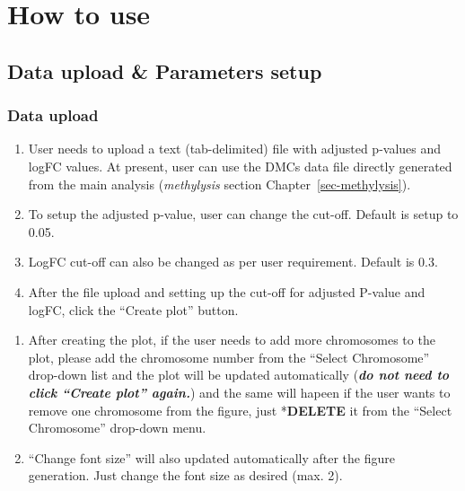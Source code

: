 \documentclass[
  a4paper,
  oneside,
  open=any]{scrreport}
\providecommand{\tightlist}{%
  \setlength{\itemsep}{0pt}\setlength{\parskip}{0pt}}\usepackage{longtable,booktabs,array}
\begin{document}
\hypertarget{how-to-use-6}{%
\section{How to use}\label{how-to-use-6}}

\hypertarget{data-upload-parameters-setup-3}{%
\subsection{Data upload \& Parameters
setup}\label{data-upload-parameters-setup-3}}

\hypertarget{data-upload-3}{%
\subsubsection{Data upload}\label{data-upload-3}}

\begin{enumerate}
\def\labelenumi{\arabic{enumi}.}
\tightlist
\item
  User needs to upload a text (tab-delimited) file with adjusted
  p-values and logFC values. At present, user can use the DMCs data file
  directly generated from the main analysis (\emph{methylysis} section
  Chapter~\ref{sec-methylysis}).
\item
  To setup the adjusted p-value, user can change the cut-off. Default is
  setup to 0.05.
\item
  LogFC cut-off can also be changed as per user requirement. Default is
  0.3.
\item
  After the file upload and setting up the cut-off for adjusted P-value
  and logFC, click the ``Create plot'' button.
\end{enumerate}

\begin{tcolorbox}[enhanced jigsaw, left=2mm, colback=white, breakable, leftrule=.75mm, coltitle=black, toprule=.15mm, rightrule=.15mm, colbacktitle=quarto-callout-tip-color!10!white, title=\textcolor{quarto-callout-tip-color}{\faLightbulb}\hspace{0.5em}{Tip}, opacitybacktitle=0.6, colframe=quarto-callout-tip-color-frame, bottomrule=.15mm, bottomtitle=1mm, toptitle=1mm, titlerule=0mm, opacityback=0, arc=.35mm]

\begin{enumerate}
\def\labelenumi{\arabic{enumi}.}
\tightlist
\item
  After creating the plot, if the user needs to add more chromosomes to
  the plot, please add the chromosome number from the ``Select
  Chromosome'' drop-down list and the plot will be updated automatically
  (\textbf{\emph{do not need to click ``Create plot'' again.}}) and the
  same will hapeen if the user wants to remove one chromosome from the
  figure, just *\textbf{DELETE} it from the ``Select Chromosome''
  drop-down menu.
\item
  ``Change font size'' will also updated automatically after the figure
  generation. Just change the font size as desired (max. 2).
\end{enumerate}

\end{tcolorbox}
\end{document}
